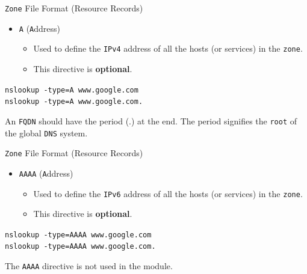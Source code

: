 \documentclass[aspectratio=169,xcolor=table]{beamer}
\begin{document}
\begin{frame}{\texttt{Zone} File Format (Resource Records)}
  \begin{itemize}
    \item \texttt{A} (\texttt{A}ddress)
       \begin{itemize}
          \item Used to define the \texttt{IPv4} address of all the hosts (or services) in the \texttt{zone}.
          \item This directive is \textbf{optional}.
       \end{itemize}
  \end{itemize}
  \begin{tcolorbox}
    \begin{center}
      \texttt{nslookup -type=A www.google.com}\\
      \texttt{nslookup -type=A www.google.com.}
    \end{center}
  \end{tcolorbox}
  \begin{tcolorbox}[title={\textbf{NOTE:}}]
      An \texttt{FQDN} should have the period (.) at the end. The period signifies the \texttt{root} of the global \texttt{DNS} system.
  \end{tcolorbox}
\end{frame}

\begin{frame}{\texttt{Zone} File Format (Resource Records)}
  \begin{itemize}
    \item \texttt{AAAA} (\texttt{A}ddress)
       \begin{itemize}
          \item Used to define the \texttt{IPv6} address of all the hosts (or services) in the \texttt{zone}.
          \item This directive is \textbf{optional}.
       \end{itemize}
  \end{itemize}
  \begin{tcolorbox}
    \begin{center}
      \texttt{nslookup -type=AAAA www.google.com}\\
      \texttt{nslookup -type=AAAA www.google.com.}
    \end{center}
  \end{tcolorbox}
  \begin{tcolorbox}[title={\textbf{NOTE:}}]
      The \texttt{AAAA} directive is not used in the module.
  \end{tcolorbox}
\end{frame}
\end{document}
